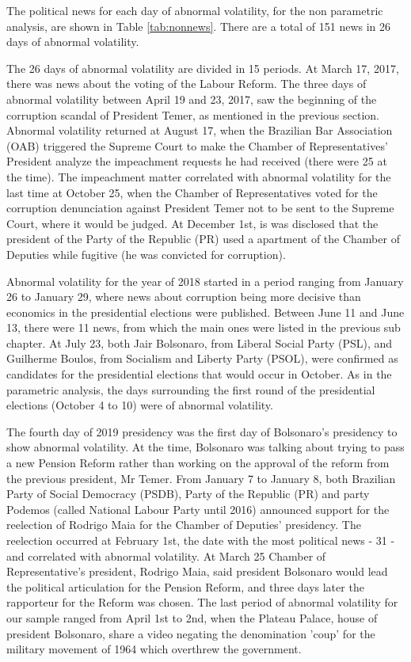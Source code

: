 \documentclass[cic,tc, english]{iiufrgs}
\begin{document}
    The political news for each day of abnormal volatility, for the non parametric analysis, are shown in Table \ref{tab:nonnews}. There are a total of 151 news in 26 days of abnormal volatility.

    

    The 26 days of abnormal volatility are divided in 15 periods. At March 17, 2017, there was news about the voting of the Labour Reform. The three days of abnormal volatility between April 19 and 23, 2017, saw the beginning of the corruption scandal of President Temer, as mentioned in the previous section. Abnormal volatility returned at August 17, when the Brazilian Bar Association (OAB) triggered the Supreme Court to make the Chamber of Representatives' President analyze the impeachment requests he had received (there were 25 at the time). The impeachment matter correlated with abnormal volatility for the last time at October 25, when the Chamber of Representatives voted for the corruption denunciation against President Temer not to be sent to the Supreme Court, where it would be judged. At December 1st, is was disclosed that the president of the Party of the Republic (PR) used a apartment of the Chamber of Deputies while fugitive (he was convicted for corruption).

    Abnormal volatility for the year of 2018 started in a period ranging from January 26 to January 29, where news about corruption being more decisive than economics in the presidential elections were published. Between June 11 and June 13, there were 11 news, from which the main ones were listed in the previous sub chapter. At July 23, both Jair Bolsonaro, from Liberal Social Party (PSL), and Guilherme Boulos, from Socialism and Liberty Party (PSOL), were confirmed as candidates for the presidential elections that would occur in October. As in the parametric analysis, the days surrounding the first round of the presidential elections (October 4 to 10) were of abnormal volatility.

    The fourth day of 2019 presidency was the first day of Bolsonaro's presidency to show abnormal volatility. At the time, Bolsonaro was talking about trying to pass a new Pension Reform rather than working on the approval of the reform from the previous president, Mr Temer. From January 7 to January 8, both Brazilian Party of Social Democracy (PSDB), Party of the Republic (PR) and party Podemos (called National Labour Party until 2016) announced support for the reelection of Rodrigo Maia for the Chamber of Deputies' presidency. The reelection occurred at February 1st, the date with the most political news - 31 - and correlated with abnormal volatility. At March 25 Chamber of Representative's president, Rodrigo Maia, said president Bolsonaro would lead the political articulation for the Pension Reform, and three days later the rapporteur for the Reform was chosen. The last period of abnormal volatility for our sample ranged from April 1st to 2nd, when the Plateau Palace, house of president Bolsonaro, share a video negating the denomination 'coup' for the military movement of 1964 which overthrew the government.
\end{document}
